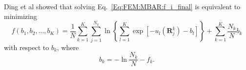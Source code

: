 Ding et al\cite{DingJCTC2019} showed that solving Eq.~\ref{Eq:FEM:MBAR:f_i_final} is equivalent to minimizing
\begin{equation}
    f(b_1,b_2,\dots,b_K)=\frac{1}{N}\sum_{k=1}^{K}\sum_{j=1}^{N_k}\ln{\left\{\sum_{l=1}^{K}\exp{\left[-u_l(\mathbf{R}_j^{k})-b_l\right]}\right\}}+\sum_{k=1}^{K}\frac{N_k}{N}b_k
\end{equation}
with respect to $b_k$, where
\begin{equation}
	b_k=-\ln{\frac{N_k}{N}}-f_k.
\end{equation}
